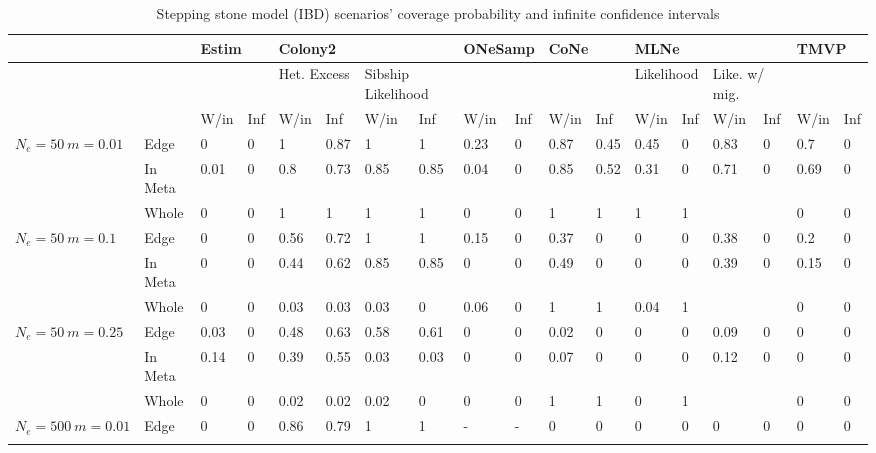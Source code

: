 \begin{landscape}
\begin{table}[h]
\centering \tiny
\caption[Stepping stone model (IBD) scenarios' coverage probability and infinite confidence intervals]{Stepping stone model (IBD) scenarios' coverage probability and infinite confidence intervals}
\label{tab:ne8}
\begin{tabular}{ | l| l|| l| l| l| l| l| l| l| l| l| l| l| l| l| l| l| l| }
\hline
\multicolumn{2}{l}{} & \multicolumn{2}{l}{Estim} & \multicolumn{4}{l}{Colony2} & \multicolumn{2}{l}{ONeSamp} & \multicolumn{2}{l}{CoNe} & \multicolumn{4}{l}{MLNe} & \multicolumn{2}{l}{TMVP}  \\ \hline
\multicolumn{2}{l}{} & \multicolumn{2}{l}{ } & \multicolumn{2}{l}{ Het. Excess} & \multicolumn{2}{l}{ Sibship Likelihood} & \multicolumn{2}{l}{ } & \multicolumn{2}{l}{ } & \multicolumn{2}{l}{Likelihood} & \multicolumn{2}{l}{Like. w/ mig.} & \multicolumn{2}{l}{ } \\ \hline
 &  & W/in & Inf & W/in & Inf & W/in & Inf & W/in & Inf & W/in & Inf & W/in & Inf & W/in & Inf & W/in & Inf   \\ \hline
\multirow{3}{1cm}{$N_e = 50 ~ m = 0.01$} & Edge & 0 & 0 & 1 & 0.87 & 1 & 1 & 0.23 & 0 & 0.87 & 0.45 & 0.45 & 0 & 0.83 & 0 & 0.7 & 0  \\ \cline{2-18}
  & In Meta & 0.01 & 0 & 0.8 & 0.73 & 0.85 & 0.85 & 0.04 & 0 & 0.85 & 0.52 & 0.31 & 0 & 0.71 & 0 & 0.69 & 0  \\ \cline{2-18}
  & Whole & 0 & 0 & 1 & 1 & 1 & 1 & 0 & 0 & 1 & 1 & 1 & 1 &  &  & 0 & 0  \\ \hline
\multirow{3}{1cm}{$N_e = 50 ~ m = 0.1$} & Edge & 0 & 0 & 0.56 & 0.72 & 1 & 1 & 0.15 & 0 & 0.37 & 0 & 0 & 0 & 0.38 & 0 & 0.2 & 0  \\ \cline{2-18}
  & In Meta & 0 & 0 & 0.44 & 0.62 & 0.85 & 0.85 & 0 & 0 & 0.49 & 0 & 0 & 0 & 0.39 & 0 & 0.15 & 0  \\ \cline{2-18}
  & Whole & 0 & 0 & 0.03 & 0.03 & 0.03 & 0 & 0.06 & 0 & 1 & 1 & 0.04 & 1 &  &  & 0 & 0  \\ \hline
\multirow{3}{1cm}{$N_e = 50 ~ m = 0.25$} & Edge & 0.03 & 0 & 0.48 & 0.63 & 0.58 & 0.61 & 0 & 0 & 0.02 & 0 & 0 & 0 & 0.09 & 0 & 0 & 0  \\ \cline{2-18}
  & In Meta & 0.14 & 0 & 0.39 & 0.55 & 0.03 & 0.03 & 0 & 0 & 0.07 & 0 & 0 & 0 & 0.12 & 0 & 0 & 0  \\ \cline{2-18}
  & Whole & 0 & 0 & 0.02 & 0.02 & 0.02 & 0 & 0 & 0 & 1 & 1 & 0 & 1 &  &  & 0 & 0  \\ \hline
\multirow{3}{1cm}{$N_e = 500 ~ m = 0.01$} & Edge & 0 & 0 & 0.86 & 0.79 & 1 & 1 & - & - & 0 & 0 & 0 & 0 & 0 & 0 & 0 & 0  \\ \cline{2-18}

\end{tabular}
\end{table}
\end{landscape}
